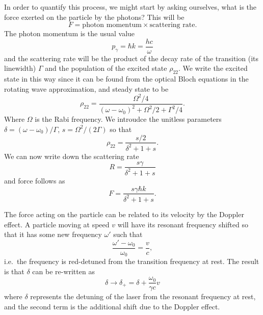 In order to quantify this process, we might start by asking ourselves, what is
the force exerted on the particle by the photons? This will be~\cite{Foot2005}
%
\begin{equation}
  F = \text{photon momentum} \times \text{scattering rate}.
\end{equation}
%
The photon momentum is the usual value
%
\begin{equation}
  p_\gamma = \hbar k = \frac{hc}{\omega}
\end{equation}
%
and the scattering rate will be the product of the decay rate of the transition
(its linewidth) $\Gamma$ and the population of the excited state $\rho_{22}$.
We write the excited state in this way since it can be found from the optical
Bloch equations in the rotating wave approximation, and steady state to
be~\cite{Metcalf1999}
%
\begin{equation}
\rho_{22} = \frac{\Omega^2/4}{(\omega-\omega_0)^2 + \Omega^2/2 + \Gamma^2/4}.
\end{equation}
%
Where $\Omega$ is the Rabi frequency. We introudce the unitless parameters
$\delta = (\omega - \omega_0)/\Gamma$, $s=\Omega^2/(2\Gamma)$ so that
%
\begin{equation}
  \rho_{22} = \frac{s/2}{\delta^2 + 1 + s}.
\end{equation}
%
We can now write down the scattering rate
%
\begin{equation}
  R = \frac{s\gamma}{\delta^2 + 1 + s}
\end{equation}
%
and force follows as
%
\begin{equation}
  F = \frac{s\gamma\hbar k}{\delta^2 + 1 + s}.
\end{equation}

The force acting on the particle can be related to its velocity by the Doppler
effect. A particle moving at speed $v$ will have its resonant frequency shifted
so that it has some new frequency $\omega'$ such that
%
\begin{equation}
  \frac{\omega'-\omega_0}{\omega_0} = \frac{v}{c},
\end{equation}
%
i.e.\ the frequency is red-detuned from the transition frequency at rest. The
result is that $\delta$ can be re-written as
%
\begin{equation}
  \delta \rightarrow \delta_+ = \delta + \frac{\omega_0}{\gamma c}v
\end{equation}
%
where $\delta$ represents the detuning of the laser from the resonant frequency
at rest, and the second term is the additional shift due to the Doppler effect.

